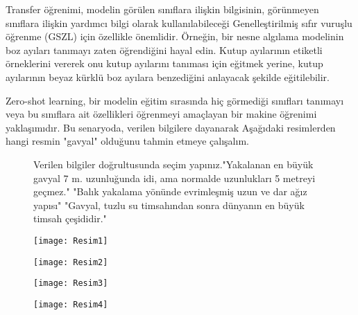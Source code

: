 \documentclass[10pt,a4paper]{report}
\begin{document}
\begin{justify}
	Transfer öğrenimi, modelin görülen sınıflara ilişkin bilgisinin, görünmeyen sınıflara ilişkin yardımcı bilgi olarak kullanılabileceği Genelleştirilmiş sıfır vuruşlu öğrenme (GSZL) için özellikle önemlidir. Örneğin, bir nesne algılama modelinin boz ayıları tanımayı zaten öğrendiğini hayal edin. Kutup ayılarının etiketli örneklerini vererek onu kutup ayılarını tanıması için eğitmek yerine, kutup ayılarının beyaz kürklü boz ayılara benzediğini anlayacak şekilde eğitilebilir\cite{bergmann2024zero}.\newline
	
	
	Zero-shot learning, bir modelin eğitim sırasında hiç görmediği sınıfları tanımayı veya bu sınıflara ait özellikleri öğrenmeyi amaçlayan bir makine öğrenimi yaklaşımıdır. Bu senaryoda, verilen bilgilere dayanarak Aşağıdaki resimlerden hangi resmin "gavyal" olduğunu tahmin etmeye çalışalım.
	
		\begin{landscape} %
		
		
		\begin{figure}[!h] %
				Verilen bilgiler doğrultusunda seçim yapınız.\newline "Yakalanan en büyük gavyal 7 m. uzunluğunda idi, ama normalde uzunlukları 5 metreyi geçmez."
			"Balık yakalama yönünde evrimleşmiş uzun ve dar ağız yapısı"
			"Gavyal, tuzlu su timsahından sonra dünyanın en büyük timsah çeşididir."
			
			\begin{minipage}[t]{0.400\linewidth}
				\centering
				\texttt{[image: Resim1]}
				\caption{\cite{ceylan2014hayvanlar}}
			\end{minipage}\hfill
			\begin{minipage}[t]{0.400\linewidth}
				\centering
				\texttt{[image: Resim2]}
				\caption{\cite{ceylan2014hayvanlar}}
			\end{minipage}
			
			\vspace{0.5cm}
			
			\begin{minipage}[b]{0.400\linewidth}
				\centering
				\texttt{[image: Resim3]}
				\caption{\cite{ceylan2014hayvanlar}}
			\end{minipage}\hfill
			\begin{minipage}[b]{0.400\linewidth}
				\centering
				\texttt{[image: Resim4]}
				\caption{\cite{stokfoto}}
			\end{minipage}
			

\end{figure}
\end{landscape}
\end{justify}
\end{document}
